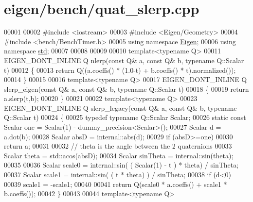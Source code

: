 \hypertarget{eigen_2bench_2quat__slerp_8cpp_source}{}\section{eigen/bench/quat\+\_\+slerp.cpp}
\label{eigen_2bench_2quat__slerp_8cpp_source}

\begin{DoxyCode}
00001 
00002 \textcolor{preprocessor}{#include <iostream>}
00003 \textcolor{preprocessor}{#include <Eigen/Geometry>}
00004 \textcolor{preprocessor}{#include <bench/BenchTimer.h>}
00005 \textcolor{keyword}{using namespace }\hyperlink{namespace_eigen}{Eigen};
00006 \textcolor{keyword}{using namespace }\hyperlink{namespacestd}{std};
00007 
00008 
00009 
00010 \textcolor{keyword}{template}<\textcolor{keyword}{typename} Q>
00011 EIGEN\_DONT\_INLINE Q nlerp(\textcolor{keyword}{const} Q& a, \textcolor{keyword}{const} Q& b, \textcolor{keyword}{typename} Q::Scalar t)
00012 \{
00013   \textcolor{keywordflow}{return} Q((a.coeffs() * (1.0-t) + b.coeffs() * t).normalized());
00014 \}
00015 
00016 \textcolor{keyword}{template}<\textcolor{keyword}{typename} Q>
00017 EIGEN\_DONT\_INLINE Q slerp\_eigen(\textcolor{keyword}{const} Q& a, \textcolor{keyword}{const} Q& b, \textcolor{keyword}{typename} Q::Scalar t)
00018 \{
00019   \textcolor{keywordflow}{return} a.slerp(t,b);
00020 \}
00021 
00022 \textcolor{keyword}{template}<\textcolor{keyword}{typename} Q>
00023 EIGEN\_DONT\_INLINE Q slerp\_legacy(\textcolor{keyword}{const} Q& a, \textcolor{keyword}{const} Q& b, \textcolor{keyword}{typename} Q::Scalar t)
00024 \{
00025   \textcolor{keyword}{typedef} \textcolor{keyword}{typename} Q::Scalar Scalar;
00026   \textcolor{keyword}{static} \textcolor{keyword}{const} Scalar one = Scalar(1) - dummy\_precision<Scalar>();
00027   Scalar d = a.dot(b);
00028   Scalar absD = internal::abs(d);
00029   \textcolor{keywordflow}{if} (absD>=one)
00030     \textcolor{keywordflow}{return} a;
00031 
00032   \textcolor{comment}{// theta is the angle between the 2 quaternions}
00033   Scalar theta = std::acos(absD);
00034   Scalar sinTheta = internal::sin(theta);
00035 
00036   Scalar scale0 = internal::sin( ( Scalar(1) - t ) * theta) / sinTheta;
00037   Scalar scale1 = internal::sin( ( t * theta) ) / sinTheta;
00038   \textcolor{keywordflow}{if} (d<0)
00039     scale1 = -scale1;
00040 
00041   \textcolor{keywordflow}{return} Q(scale0 * a.coeffs() + scale1 * b.coeffs());
00042 \}
00043 
00044 \textcolor{keyword}{template}<\textcolor{keyword}{typename} Q>

\end{DoxyCode}
